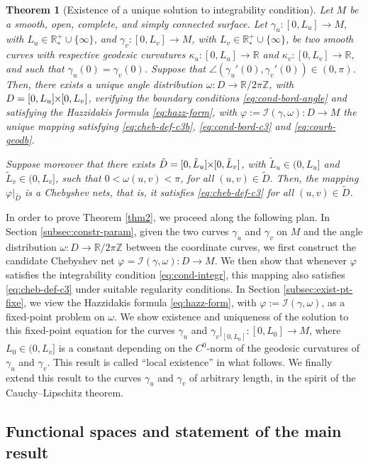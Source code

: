\documentclass{article}
\newcommand{\I}{\mathcal{I}}
\newcommand{\PLH}{{\mkern-1mu\times\mkern-1mu}}
\newcommand{\Times}{\PLH}
\newcommand{\R}{\mathbb{R}}
\newcommand{\Z}{\mathbb{Z}}
\newcommand{\surf}{M}
\newcommand{\ko}{\kappa}
\newtheorem{theorem}{Theorem}
\theoremstyle{remark}
\theoremstyle{prpart}
\begin{document}
\begin{theorem}[Existence of a unique solution to integrability condition]
  Let $\surf$ be a smooth, open, complete, and simply connected surface. Let $\gamma_u:[0,L_u]\to\surf$, with $L_u\in\R_\ast^+\cup\{\infty\}$, and $\gamma_v:[0,L_v]\to\surf$, with $L_v\in\R_\ast^+\cup\{\infty\}$, be two smooth curves with respective geodesic curvatures $\ko_u:[0,L_u]\to\R$ and $\ko_v:[0,L_v]\to\R$, and such that $\gamma_u(0) = \gamma_v(0)$. Suppose that $\angle(\gamma_u'(0),\gamma_v'(0))\in(0,\pi)$. Then, there exists a unique angle distribution $\omega:D\to\R/2\pi\Z$, with $D=[0,L_u]\Times [0,L_v]$, verifying the boundary conditions \eqref{eq:cond-bord-angle} and satisfying the Hazzidakis formula \eqref{eq:hazz-form}, with $\varphi:=\I(\gamma,\omega): D\to\surf$ the unique mapping satisfying \eqref{eq:cheb-def-c3b}, \eqref{eq:cond-bord-c3} and \eqref{eq:courb-geodb}.

  Suppose moreover that there exists $\tilde D=[0,\tilde L_u]\Times[0,\tilde L_v]$, with $\tilde L_u\in(0,L_u]$ and $\tilde L_v\in(0,L_v]$, such that $0<\omega(u,v)<\pi$, for all $(u,v)\in \tilde D$. Then, the mapping $\varphi\big|_{\tilde D}$ is a Chebyshev nets, that is, it satisfies \eqref{eq:cheb-def-c3} for all $(u,v)\in \tilde D$.
\end{theorem}

In order to prove Theorem \ref{thm2}, we proceed along the following plan. In Section \ref{subsec:constr-param}, given the two curves $\gamma_u$ and $\gamma_v$ on $\surf$ and the angle distribution $\omega:D\to\R/2\pi\Z$ between the coordinate curves, we first construct the candidate Chebyshev net $\varphi=\I(\gamma,\omega):D\to\surf$. We then show that whenever $\varphi$ satisfies the integrability condition \eqref{eq:cond-integr}, this mapping also satisfies \eqref{eq:cheb-def-c3} under suitable regularity conditions.  In Section \ref{subsec:exist-pt-fixe}, we view the Hazzidakis formula \eqref{eq:hazz-form}, with $\varphi:=\I(\gamma,\omega)$, as a fixed-point problem on $\omega$. We show existence and uniqueness of the solution to this fixed-point equation for the curves $\gamma_u$ and $\gamma_v\big|_{[0,L_0]}:[0,L_0]\to\surf$, where $L_0\in(0,L_v]$ is a constant depending on the $C^0$-norm of the geodesic curvatures of $\gamma_u$ and $\gamma_v$. This result is called ``local existence'' in what follows. We finally extend this result to the curves $\gamma_u$ and $\gamma_v$ of arbitrary length, in the spirit of the Cauchy--Lipschitz theorem.

\subsection{Functional spaces and statement of the main result}\label{sec:norms}
\end{document}
